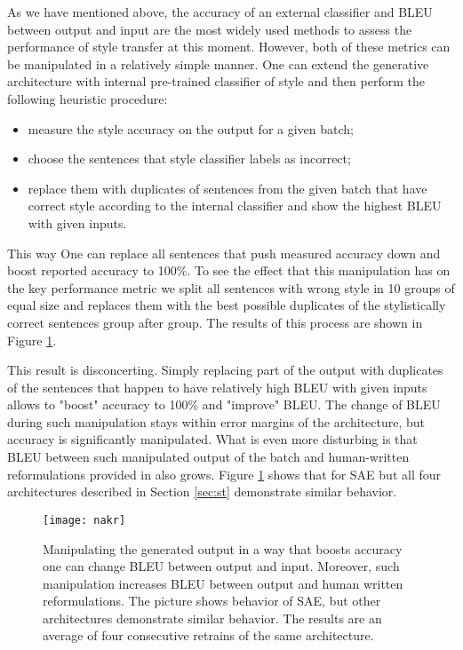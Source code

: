 \documentclass[11pt,a4paper]{article}
\begin{document}
As we have mentioned above, the accuracy of an external classifier and BLEU between output and input are the most widely used methods to assess the performance of style transfer at this moment. However, both of these metrics can be manipulated in a relatively simple manner. One can extend the generative architecture with internal pre-trained classifier of style and then perform the following heuristic procedure:
\begin{itemize}
    \item measure the style accuracy on the output for a given batch;
    \item choose the sentences that style classifier labels as incorrect;
    \item replace them with duplicates of sentences from the given batch that have correct style according to the internal classifier and show the highest BLEU with given inputs.
\end{itemize}

This way One can replace all sentences that push measured accuracy down and boost reported accuracy to 100\%. To see the effect that this manipulation has on the key performance metric we split all sentences with wrong style in 10 groups of equal size and replaces them with the best possible duplicates of the stylistically correct sentences group after group. The results of this process are shown in Figure \ref{pic:nakr}.

This result is disconcerting. Simply replacing part of the output with duplicates of the sentences that happen to have relatively high BLEU with given inputs allows to "boost" accuracy to 100\% and "improve" BLEU. The change of BLEU during such manipulation stays within error margins of the architecture, but accuracy is significantly manipulated. What is even more disturbing is that BLEU between such manipulated output of the batch and human-written reformulations provided in \cite{tian18} also grows. Figure \ref{pic:nakr} shows that for SAE but all four architectures described in Section \ref{sec:st} demonstrate similar behavior. 



\begin{figure}[ht]
\begin{center}
\centerline{\texttt{[image: nakr]}}
\caption{Manipulating the generated output in a way that boosts accuracy one can change BLEU between output and input. Moreover, such manipulation increases BLEU between output and human written reformulations. The picture shows behavior of SAE, but other architectures demonstrate similar behavior. The results are an average of four consecutive retrains of the same architecture.}
\label{pic:nakr}
\end{center}
\end{figure}
\end{document}

